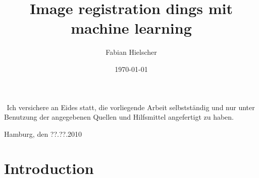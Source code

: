 \documentclass[
a4paper, 
12pt,
grayscalebody, %
abstract=on,
twoside, BCOR10mm, 12pt, DIV13,headinclude, footexclude, final, abstracton, openright
]{ibireprt}
\author{Fabian Hielscher}
\title{Image registration dings mit machine learning}
\date{\today}
\numberwithin{equation}{chapter}
\numberwithin{table}{chapter}
\numberwithin{figure}{chapter}
\numberwithin{algorithm}{chapter}
\numberwithin{example}{chapter}
\numberwithin{example}{chapter}
\begin{document}
	\maketitle
	
	\newpage
	${}^{}$
	\vfill
	\noindent
	Ich versichere an Eides statt, die vorliegende Arbeit selbstständig und nur unter Benutzung der angegebenen Quellen und Hilfsmittel angefertigt zu haben.\\
	\vspace{1.5cm}
	
	\noindent
	Hamburg, den ??.??.2010
	\thispagestyle{empty}
	\newpage
	\newpage
	
	\setlength{\parskip}{1.5mm }
	
	
	
	
	\setcounter{tocdepth}{2}
	\tableofcontents
	\begin{abstract}
	
	\end{abstract}
	
	\chapter{Introduction}
\end{document}
